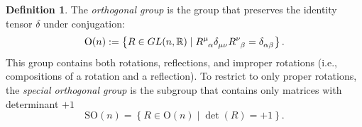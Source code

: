 \documentclass{amsart}
\theoremstyle{definition}
\newtheorem{definition}[theorem]{Definition}
\theoremstyle{remark}
\begin{document}
\begin{definition}
  The \emph{orthogonal group} is the group that preserves the identity tensor $\delta$ under conjugation:
  \begin{align*}
    \mathrm{O}(n) := \left\{R \in GL(n, \mathbb{R}) \mid \tensor{R}{^\mu_\alpha} \tensor{\delta}{_\mu_\nu} \tensor{R}{^\nu_\beta} = \tensor{\delta}{_\alpha_\beta}\right\}.
  \end{align*}
  This group contains both rotations, reflections, and improper rotations (i.e., compositions of a rotation and a reflection). To restrict to only proper rotations, the \emph{special orthogonal group} is the subgroup that contains only matrices with determinant $+1$
  \begin{equation*}
    \mathrm{SO}(n) = \left\{ R \in \mathrm{O}(n) \mid \det(R) = +1\right\}.
  \end{equation*}
\end{definition}
\end{document}
